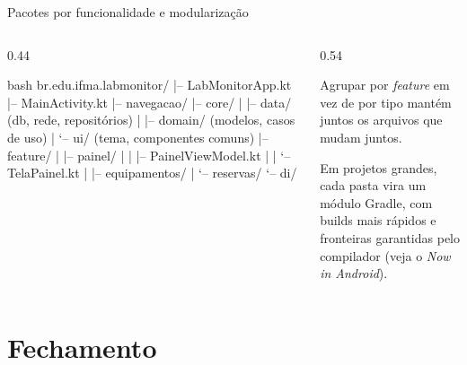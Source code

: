 \documentclass[aspectratio=169,10pt]{beamer}
\begin{document}
\begin{frame}[fragile]{Pacotes por funcionalidade e modularização}
  \begin{columns}[T]
    \begin{column}{0.44\textwidth}
\begin{codigo}[title=Pacotes por feature]{bash}
br.edu.ifma.labmonitor/
|-- LabMonitorApp.kt
|-- MainActivity.kt
|-- navegacao/
|-- core/
|   |-- data/   (db, rede, repositórios)
|   |-- domain/ (modelos, casos de uso)
|   `-- ui/     (tema, componentes comuns)
|-- feature/
|   |-- painel/
|   |   |-- PainelViewModel.kt
|   |   `-- TelaPainel.kt
|   |-- equipamentos/
|   `-- reservas/
`-- di/
\end{codigo}
    \end{column}
    \begin{column}{0.54\textwidth}
      \begin{conceito}
        Agrupar por \emph{feature} em vez de por tipo mantém juntos os arquivos que mudam juntos.
      \end{conceito}
      \centering
      \begin{dica}
        Em projetos grandes, cada pasta vira um módulo Gradle, com builds mais rápidos e fronteiras garantidas pelo compilador (veja o \emph{Now in Android}).
      \end{dica}
    \end{column}
  \end{columns}
\end{frame}

\section{Fechamento}
\end{document}
